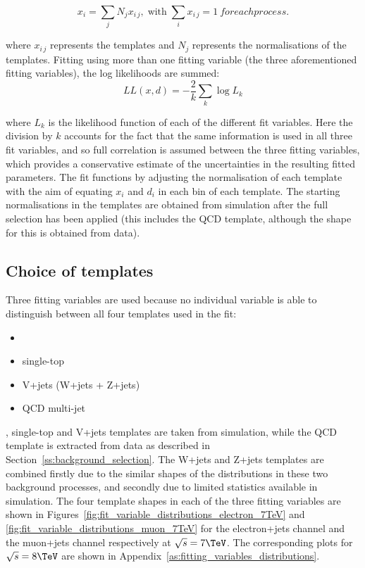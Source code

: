 \begin{equation}
\label{eq:sum_mc}
x_i = \sum\limits_{j}N_{j}x_{i\,j},\;\text{with}\;\sum\limits_{i}x_{i\,j}=1\ for each process.
\end{equation}

where $x_{i\,j}$ represents the templates and $N_{j}$ represents the normalisations of the templates.
Fitting using more than one fitting variable (the three aforementioned fitting variables), the log likelihoods are summed:
\begin{equation}
\label{eq:log_L_final}
LL\left(x, d\right) = -\frac{2}{k} \sum\limits_{k} \log{L_k}
\end{equation}

where $L_k$ is the likelihood function of each of the different fit variables. Here the division by $k$
accounts for the fact that the same information is used in all three fit variables, and so full correlation is
assumed between the three fitting variables, which provides a conservative estimate of the uncertainties in
the resulting fitted parameters.
The fit functions by adjusting the normalisation of each template with the aim of equating $x_{i}$ and $d_{i}$
in each bin of each template. The starting normalisations in the templates are obtained from simulation after
the full selection has been applied (this includes the QCD template, although the shape for this is obtained
from data).

\subsection{Choice of templates}
\label{choice_of_templates}

Three fitting variables are used because no individual variable is able to distinguish between all four
templates used in the fit:

\begin{itemize}
  \item {\ttbar}
  \item{single-top}
  \item{V+jets (W+jets + Z+jets)}
  \item{QCD multi-jet} 
\end{itemize}

\ttbar, single-top and V+jets templates are taken from simulation, while the QCD template is extracted from
data as described in Section~\ref{ss:background_selection}. The W+jets and Z+jets templates are combined
firstly due to the similar shapes of the distributions in these two background processes, and secondly due to
limited statistics available in simulation. The four template shapes in each of the three fitting variables
are shown in Figures~\ref{fig:fit_variable_distributions_electron_7TeV} and
\ref{fig:fit_variable_distributions_muon_7TeV} for the electron+jets channel and the muon+jets channel
respectively at $\sqrt{s}=7\TeV$. The corresponding plots for $\sqrt{s}=8\TeV$ are shown in
Appendix~\ref{as:fitting_variables_distributions}.

